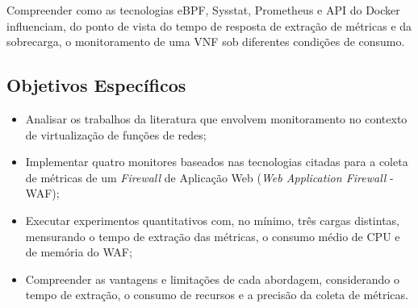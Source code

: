Compreender como as tecnologias eBPF, Sysstat, Prometheus e API do Docker influenciam, do ponto de vista do tempo de resposta de extração de métricas e da sobrecarga, o monitoramento de uma VNF sob diferentes condições de consumo.

\subsection{Objetivos Específicos}

\begin{itemize}
  \item Analisar os trabalhos da literatura que envolvem monitoramento no contexto de virtualização de funções de redes;
  \item Implementar quatro monitores baseados nas tecnologias citadas para a coleta de métricas de um \textit{Firewall} de Aplicação Web (\textit{Web Application Firewall} - WAF);
  \item Executar experimentos quantitativos com, no mínimo, três cargas distintas, mensurando o tempo de extração das métricas, o consumo médio de CPU e de memória do WAF;
  \item Compreender as vantagens e limitações de cada abordagem, considerando o tempo de extração, o consumo de recursos e a precisão da coleta de métricas.
\end{itemize}
